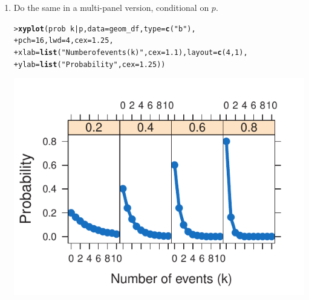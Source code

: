 \documentclass[11pt]{report}\usepackage[]{graphicx}\usepackage[]{color}
\makeatletter
\newcommand{\hlnum}[1]{\textcolor[rgb]{0.686,0.059,0.569}{#1}}%
\newcommand{\hlstr}[1]{\textcolor[rgb]{0.192,0.494,0.8}{#1}}%
\newcommand{\hlopt}[1]{\textcolor[rgb]{0,0,0}{#1}}%
\newcommand{\hlstd}[1]{\textcolor[rgb]{0.345,0.345,0.345}{#1}}%
\newcommand{\hlkwc}[1]{\textcolor[rgb]{0.333,0.667,0.333}{#1}}%
\newcommand{\hlkwd}[1]{\textcolor[rgb]{0.737,0.353,0.396}{\textbf{#1}}}%
\newenvironment{kframe}{%
 \def\at@end@of@kframe{}%
 \ifinner\ifhmode%
  \def\at@end@of@kframe{\end{minipage}}%
  \begin{minipage}{\columnwidth}%
 \fi\fi%
 \def\FrameCommand##1{\hskip\@totalleftmargin \hskip-\fboxsep
 \colorbox{shadecolor}{##1}\hskip-\fboxsep
     \hskip-\linewidth \hskip-\@totalleftmargin \hskip\columnwidth}%
 \MakeFramed {\advance\hsize-\width
   \@totalleftmargin\z@ \linewidth\hsize
   \@setminipage}}%
 {\par\unskip\endMakeFramed%
 \at@end@of@kframe}
\newenvironment{knitrout}{}{} %
\renewenvironment{knitrout}{\small\renewcommand{\baselinestretch}{.85}}{} %
\makeatother
\begin{document}
\begin{Exercises}
\begin{enumerate}
\begin{ans}
\begin{knitrout}
\end{knitrout}
    \end{ans}
    
    \item Do the same in a multi-panel version, conditional on $p$.
    \begin{ans}
\begin{knitrout}
\color{fgcolor}\begin{kframe}
\begin{alltt}
\hlstd{> }\hlkwd{xyplot}\hlstd{(prob} \hlopt{~} \hlstd{k} \hlopt{|} \hlstd{p ,} \hlkwc{data} \hlstd{= geom_df,} \hlkwc{type} \hlstd{=} \hlkwd{c}\hlstd{(}\hlstr{"b"}\hlstd{),}
\hlstd{+ }       \hlkwc{pch} \hlstd{=} \hlnum{16}\hlstd{,} \hlkwc{lwd} \hlstd{=} \hlnum{4}\hlstd{,} \hlkwc{cex} \hlstd{=} \hlnum{1.25}\hlstd{,}
\hlstd{+ }       \hlkwc{xlab} \hlstd{=} \hlkwd{list}\hlstd{(}\hlstr{"Number of events (k)"}\hlstd{,} \hlkwc{cex} \hlstd{=} \hlnum{1.1}\hlstd{),} \hlkwc{layout} \hlstd{=} \hlkwd{c}\hlstd{(}\hlnum{4}\hlstd{,}\hlnum{1}\hlstd{),}
\hlstd{+ }       \hlkwc{ylab} \hlstd{=} \hlkwd{list}\hlstd{(}\hlstr{"Probability"}\hlstd{,} \hlkwc{cex} \hlstd{=} \hlnum{1.25}\hlstd{))}
\end{alltt}
\end{kframe}

\centerline{\includegraphics{soln/fig/ex3_2c-1} }



\end{knitrout}
    \end{ans}
    
  \end{enumerate}


\end{Exercises}
\end{document}
